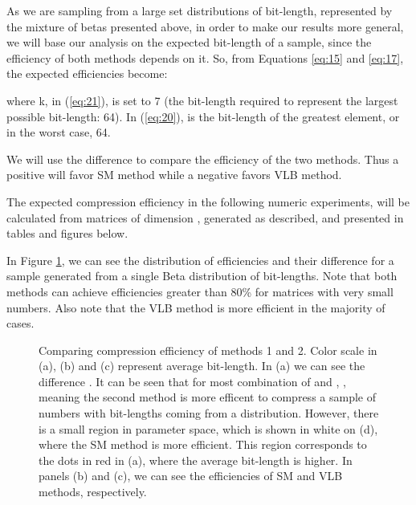 \documentclass[10pt]{article}
\begin{document}
As we are sampling from a large set distributions of bit-length, represented by the mixture of betas presented above, in order to make our results more general, we will base our analysis on the expected bit-length of a sample, since the efficiency of both methods depends on it. So, from Equations \ref{eq:15} and \ref{eq:17}, the expected efficiencies become: 
 




\noindent where k, in (\ref{eq:21}), is set to 7 (the bit-length required to represent the largest possible bit-length: 64). In (\ref{eq:20}),  is the bit-length of the greatest element, or in the worst case, 64.

We will use the difference  to compare the efficiency of the two methods. Thus a positive  will favor SM method while a negative  favors VLB method.

The expected compression efficiency in the following numeric experiments, will be calculated from  matrices of dimension , generated as described, and presented in tables and figures below. 
 
In Figure \ref{fig:06070809}, we can see the distribution of efficiencies and their difference for a sample generated from a single Beta distribution of bit-lengths. Note that both methods can achieve efficiencies greater than 80\% for matrices with very small numbers. Also note that the VLB method is more efficient in the majority of cases.
 
\begin{figure}[h]
  \centering
  \caption{Comparing compression efficiency of methods 1 and 2. Color scale in (a), (b) and (c) represent average bit-length. In (a) we can see the difference . It can be seen that for most combination of  and , , meaning the second method is more efficent to compress a sample of numbers with bit-lengths coming from a  distribution. However, there is a small region in parameter space, which is shown in white on (d), where the SM method is more efficient. This region corresponds to the dots in red in (a), where the average bit-length is higher. In panels (b) and (c), we can see the efficiencies of SM and VLB methods, respectively.}
  \label{fig:06070809}
\end{figure}
 
\end{document}
